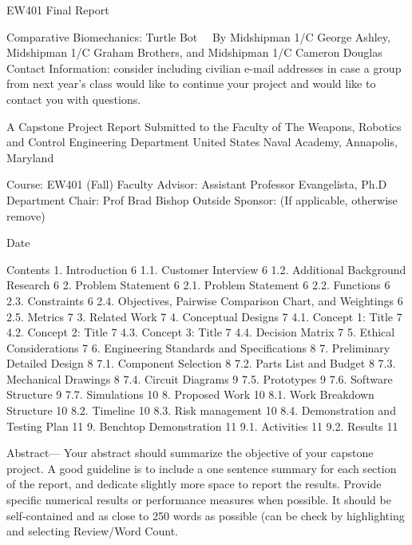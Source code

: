 

EW401 Final Report

Comparative Biomechanics: Turtle Bot  
By
Midshipman 1/C George Ashley, Midshipman 1/C Graham Brothers, and Midshipman 1/C Cameron Douglas
Contact Information: consider including civilian e-mail addresses in case a group from next year’s class would like to continue your project and would like to contact you with questions.

A Capstone Project Report Submitted to the Faculty of
The Weapons, Robotics and Control Engineering Department
United States Naval Academy, Annapolis, Maryland

Course:  EW401 (Fall) 
Faculty Advisor: Assistant Professor Evangelista, Ph.D
Department Chair: Prof Brad Bishop
Outside Sponsor:  (If applicable, otherwise remove)

Date
 
Contents
1.	Introduction	6
1.1.	Customer Interview	6
1.2.	Additional Background Research	6
2.	Problem Statement	6
2.1.	Problem Statement	6
2.2.	Functions	6
2.3.	Constraints	6
2.4.	Objectives, Pairwise Comparison Chart, and Weightings	6
2.5.	Metrics	7
3.	Related Work	7
4.	Conceptual Designs	7
4.1.	Concept 1:  Title	7
4.2.	Concept 2:  Title	7
4.3.	Concept 3:  Title	7
4.4.	Decision Matrix	7
5.	Ethical Considerations	7
6.	Engineering Standards and Specifications	8
7.	Preliminary Detailed Design	8
7.1.	Component Selection	8
7.2.	Parts List and Budget	8
7.3.	Mechanical Drawings	8
7.4.	Circuit Diagrams	9
7.5.	Prototypes	9
7.6.	Software Structure	9
7.7.	Simulations	10
8.	Proposed Work	10
8.1.	Work Breakdown Structure	10
8.2.	Timeline	10
8.3.	Risk management	10
8.4.	Demonstration and Testing Plan	11
9.	Benchtop Demonstration	11
9.1.	Activities	11
9.2.	Results	11


Abstract— Your abstract should summarize the objective of your capstone project.  A good guideline is to include a one sentence summary for each section of the report, and dedicate slightly more space to report the results.  Provide specific numerical results or performance measures when possible.  It should be self-contained and as close to 250 words as possible (can be check by highlighting and selecting Review/Word Count. 

